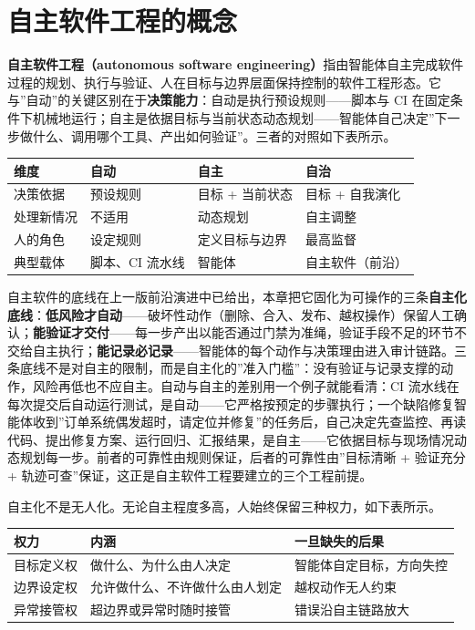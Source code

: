 \documentclass[
]{ctexbook}
\newcounter{none}
\begin{document}
\section{自主软件工程的概念}\label{ux81eaux4e3bux8f6fux4ef6ux5de5ux7a0bux7684ux6982ux5ff5}

\textbf{自主软件工程（autonomous software
engineering）}指由智能体自主完成软件过程的规划、执行与验证、人在目标与边界层面保持控制的软件工程形态。它与''自动''的关键区别在于\textbf{决策能力}：自动是执行预设规则------脚本与
CI
在固定条件下机械地运行；自主是依据目标与当前状态动态规划------智能体自己决定''下一步做什么、调用哪个工具、产出如何验证''。三者的对照如下表所示。

{\def\LTcaptype{none} %
\begin{longtable}[]{@{}llll@{}}
\toprule\noalign{}
维度 & 自动 & 自主 & 自治 \\
\midrule\noalign{}
\endhead
\bottomrule\noalign{}
\endlastfoot
决策依据 & 预设规则 & 目标 + 当前状态 & 目标 + 自我演化 \\
处理新情况 & 不适用 & 动态规划 & 自主调整 \\
人的角色 & 设定规则 & 定义目标与边界 & 最高监督 \\
典型载体 & 脚本、CI 流水线 & 智能体 & 自主软件（前沿） \\
\end{longtable}
}

自主软件的底线在上一版前沿演进中已给出，本章把它固化为可操作的三条\textbf{自主化底线}：\textbf{低风险才自动}------破坏性动作（删除、合入、发布、越权操作）保留人工确认；\textbf{能验证才交付}------每一步产出以能否通过门禁为准绳，验证手段不足的环节不交给自主执行；\textbf{能记录必记录}------智能体的每个动作与决策理由进入审计链路。三条底线不是对自主的限制，而是自主化的''准入门槛''：没有验证与记录支撑的动作，风险再低也不应自主。自动与自主的差别用一个例子就能看清：CI
流水线在每次提交后自动运行测试，是自动------它严格按预定的步骤执行；一个缺陷修复智能体收到''订单系统偶发超时，请定位并修复''的任务后，自己决定先查监控、再读代码、提出修复方案、运行回归、汇报结果，是自主------它依据目标与现场情况动态规划每一步。前者的可靠性由规则保证，后者的可靠性由''目标清晰
+ 验证充分 + 轨迹可查''保证，这正是自主软件工程要建立的三个工程前提。

自主化不是无人化。无论自主程度多高，人始终保留三种权力，如下表所示。

{\def\LTcaptype{none} %
\begin{longtable}[]{@{}lll@{}}
\toprule\noalign{}
权力 & 内涵 & 一旦缺失的后果 \\
\midrule\noalign{}
\endhead
\bottomrule\noalign{}
\endlastfoot
目标定义权 & 做什么、为什么由人决定 & 智能体自定目标，方向失控 \\
边界设定权 & 允许做什么、不许做什么由人划定 & 越权动作无人约束 \\
异常接管权 & 超边界或异常时随时接管 & 错误沿自主链路放大 \\
\end{longtable}
}
\end{document}
